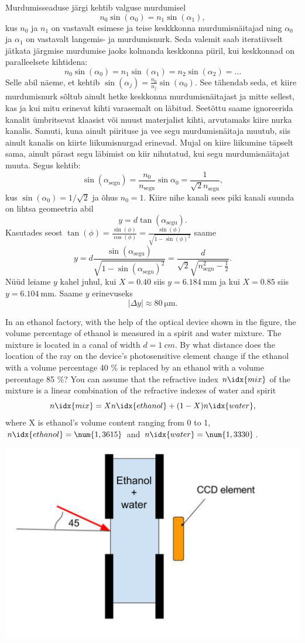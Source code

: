 \solu
Murdumisseaduse järgi kehtib valguse murdumisel
$$n_0\sin(\alpha_0)=n_1\sin(\alpha_1),$$
kus $n_0$ ja $n_1$ on vastavalt esimese ja teise keskkkonna murdumisnäitajad ning $\alpha_0$ ja $\alpha_1$ on vastavalt langemis- ja murdumisnurk. Seda valemit saab iteratiivselt jätkata järgmise murdumise jaoks kolmanda keskkonna piiril, kui keskkonnad on paralleelsete kihtidena:
$$n_0\sin(\alpha_0)=n_1\sin(\alpha_1)=n_2\sin(\alpha_2) = \dots$$
Selle abil näeme, et kehtib $\sin(\alpha_j)=\frac{n_0}{n_j}\sin(\alpha_0)$. See tähendab seda, et kiire murdumisnurk sõltub ainult hetke keskkonna murdumisnäitajast ja mitte sellest, kas ja kui mitu erinevat kihti varasemalt on läbitud. Seetõttu saame ignoreerida kanalit ümbritsevat klaasist või muust materjalist kihti, arvutamaks kiire nurka kanalis. Samuti, kuna ainult piirituse ja vee segu murdumisnäitaja muutub, siis ainult kanalis on kiirte liikumisnurgad erinevad. Mujal on kiire liikumine täpselt sama, ainult pärast segu läbimist on kiir nihutatud, kui segu murdumisnäitajat muuta. Segus kehtib:
$$\sin(\alpha_{\text{segu}})=\frac{n_0}{n_{\text{segu}}}\sin{\alpha_0} = \frac{1}{\sqrt{2}n_{\text{segu}}},$$
kus $\sin(\alpha_0) = 1/\sqrt{2}$ ja õhus $n_0=1$. Kiire nihe kanali sees piki kanali suunda on lihtsa geomeetria abil $$y=d\tan(\alpha_{\text{segu}}).$$
Kasutades seost $\tan(\phi) = \frac{\sin(\phi)}{\cos(\phi)} = \frac{\sin(\phi)}{\sqrt{1-\sin(\phi)^2}}$ saame
$$y = d \frac{\sin(\alpha_{\text{segu}})}{\sqrt{1-\sin(\alpha_{\text{segu}})^2}} = \frac{d}{\sqrt{2}\sqrt{n_{\text{segu}}^2-\frac12}}.$$
Nüüd leiame $y$ kahel juhul, kui $X=\num{0.40}$ siis $y=\SI{6.184}{\milli\meter}$ ja kui $X=\num{0.85}$ siis $y=\SI{6.104}{\milli\meter}$. Saame $y$ erinevuseks
$$|\Delta y| \approx \SI{80}{\micro\meter}.$$

In an ethanol factory, with the help of the optical device shown in the figure, the volume percentage of ethanol is measured in a spirit and water mixture. The mixture is located in a canal of width $d=\SI{1}{cm}$. By what distance does the location of the ray on the device's photosensitive element change if the ethanol with a volume percentage 40 \% is replaced by an ethanol with a volume percentage 85 \%? You can assume that the refractive index $n\idx{mix}$ of the mixture is a linear combination of the refractive indexes of water and spirit
$$
n\idx{mix}=Xn\idx{ethanol}+(1-X)n\idx{water},
$$
where X is ethanol’s volume content ranging from 0 to 1, $n\idx{ethanol}=\num{1,3615}$ and $n\idx{water}=\num{1,3330}$.
\begin{center}
	\vspace{-0pt}
	\includegraphics[width=0.5\linewidth]{2017-v2g-04-Piiritusetehas_ing}
	\vspace{-10pt}
\end{center}


